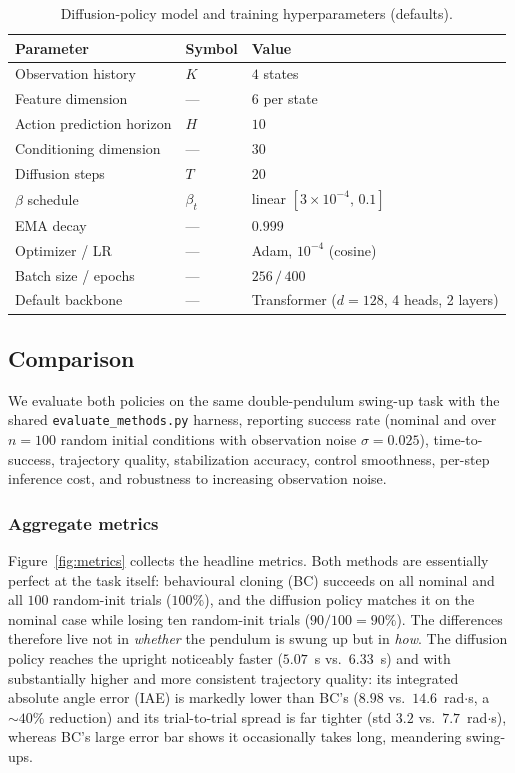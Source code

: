 \documentclass[11pt,a4paper]{article}
\newcommand{\file}[1]{\texttt{#1}}
\begin{document}
\begin{table}[t]
  \centering
  \caption{Diffusion-policy model and training hyperparameters (defaults).}
  \begin{tabular}{@{}lll@{}}
    \toprule
    \textbf{Parameter} & \textbf{Symbol} & \textbf{Value} \\
    \midrule
    Observation history       & $K$            & $4$ states \\
    Feature dimension         & ---            & $6$ per state \\
    Action prediction horizon & $H$            & $10$ \\
    Conditioning dimension    & ---            & $30$ \\
    Diffusion steps           & $T$            & $20$ \\
    $\beta$ schedule          & $\beta_t$      & linear $[3\!\times\!10^{-4},\,0.1]$ \\
    EMA decay                 & ---            & $0.999$ \\
    Optimizer / LR            & ---            & Adam, $10^{-4}$ (cosine) \\
    Batch size / epochs       & ---            & $256\,/\,400$ \\
    Default backbone          & ---            & Transformer ($d{=}128$, 4 heads, 2 layers) \\
    \bottomrule
  \end{tabular}
\end{table}

\subsection{Comparison}
We evaluate both policies on the same double-pendulum swing-up task with the shared
\file{evaluate\_methods.py} harness, reporting success rate (nominal and over $n=100$
random initial conditions with observation noise $\sigma=0.025$), time-to-success,
trajectory quality, stabilization accuracy, control smoothness, per-step inference
cost, and robustness to increasing observation noise.

\subsubsection{Aggregate metrics}
Figure~\ref{fig:metrics} collects the headline metrics. Both methods are essentially
perfect at the task itself: behavioural cloning (BC) succeeds on all nominal and
all $100$ random-init trials ($100\%$), and the diffusion policy matches it on the
nominal case while losing ten random-init trials ($90/100 = 90\%$). The
differences therefore live not in \emph{whether} the pendulum is swung up but in
\emph{how}. The diffusion policy reaches the upright noticeably faster
($5.07$~s vs.\ $6.33$~s) and with substantially higher and more consistent
trajectory quality: its integrated absolute angle error (IAE) is markedly lower
than BC's ($8.98$ vs.\ $14.6$~rad$\cdot$s, a $\sim\!40\%$ reduction) and its
trial-to-trial spread is far tighter (std $3.2$ vs.\ $7.7$~rad$\cdot$s), whereas
BC's large error bar shows it occasionally takes long, meandering swing-ups.
\end{document}
